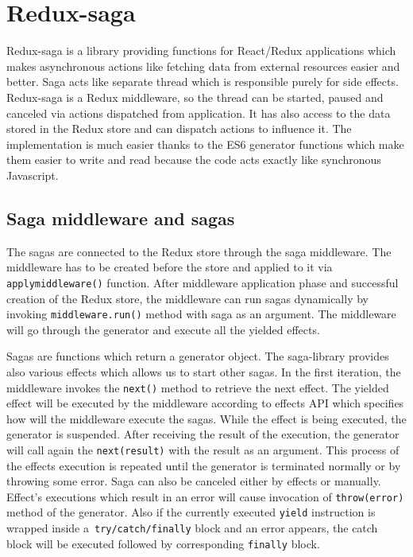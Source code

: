 \section{Redux-saga}
Redux-saga \cite{redux-saga} is a library providing functions for React/Redux applications which makes asynchronous actions like fetching data from external resources easier and better. Saga acts like separate thread which is responsible purely for side effects. Redux-saga is a Redux middleware, so the thread can be started, paused and canceled via actions dispatched from application. It has also access to the data stored in the Redux store and can dispatch actions to influence it. The implementation is much easier thanks to the ES6 generator functions which make them easier to write and read because the code acts exactly like synchronous Javascript.

\subsection{Saga middleware and sagas} \label{helpers}
The sagas are connected to the Redux store through the saga middleware. The middleware has to be created before the store and applied to it via \texttt{applymiddleware()} function. After middleware application phase and successful creation of the Redux store, the middleware can run sagas dynamically by invoking \texttt{middleware.run()} method with saga as an argument. The middleware will go through the generator and execute all the yielded effects.

Sagas are functions which return a generator object. The saga-library provides also various effects which allows us to start other sagas. In the first iteration, the middleware invokes the \texttt{next()} method to retrieve the next effect. The yielded effect will be executed by the middleware according to effects API which specifies how will the middleware execute the sagas. While the effect is being executed, the generator is suspended. After receiving the result of the execution, the generator will call again the \texttt{next(result)} with the result as an argument. This process of the effects execution is repeated until the generator is terminated normally or by throwing some error. Saga can   also be canceled either by effects or manually. Effect's executions which result in an error will cause invocation of \texttt{throw(error)} method of the generator. Also if the currently executed \texttt{yield} instruction is wrapped inside a~\texttt{try/catch/finally} block and an error appears, the catch block will be executed followed by corresponding \texttt{finally} block.\cite{redux-saga-api}

